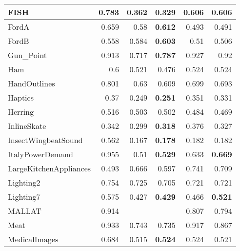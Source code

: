 \begin{longtable}[c]{|l||r||r|r||r|r|}
\hline
FISH &
0.783 &
0.362 &
0.329 &
0.606 &
0.606
\bigstrut\\
\hline
\rowcolor[rgb]{ .851,  .851,  .851} FordA &
0.659 &
0.58 &
\cellcolor[rgb]{ .973,  .796,  .678} \textbf{0.612} &
0.493 &
0.491
\bigstrut\\
\hline
FordB &
0.558 &
0.584 &
\cellcolor[rgb]{ .973,  .796,  .678} \textbf{0.603} &
0.51 &
0.506
\bigstrut\\
\hline
\rowcolor[rgb]{ .851,  .851,  .851} Gun\_Point &
0.913 &
0.717 &
\cellcolor[rgb]{ .973,  .796,  .678} \textbf{0.787} &
0.927 &
0.92
\bigstrut\\
\hline
Ham &
0.6 &
0.521 &
0.476 &
0.524 &
0.524
\bigstrut\\
\hline
\rowcolor[rgb]{ .851,  .851,  .851} HandOutlines &
0.801 &
0.63 &
0.609 &
0.699 &
0.693
\bigstrut\\
\hline
Haptics &
0.37 &
0.249 &
\cellcolor[rgb]{ .973,  .796,  .678} \textbf{0.251} &
0.351 &
0.331
\bigstrut\\
\hline
\rowcolor[rgb]{ .851,  .851,  .851} Herring &
0.516 &
0.503 &
0.502 &
0.484 &
0.469
\bigstrut\\
\hline
InlineSkate &
0.342 &
0.299 &
\cellcolor[rgb]{ .973,  .796,  .678} \textbf{0.318} &
0.376 &
0.327
\bigstrut\\
\hline
\rowcolor[rgb]{ .851,  .851,  .851} InsectWingbeatSound &
0.562 &
0.167 &
\cellcolor[rgb]{ .973,  .796,  .678} \textbf{0.178} &
0.182 &
0.182
\bigstrut\\
\hline
ItalyPowerDemand &
0.955 &
0.51 &
\cellcolor[rgb]{ .973,  .796,  .678} \textbf{0.529} &
0.633 &
\cellcolor[rgb]{ .973,  .796,  .678} \textbf{0.669}
\bigstrut\\
\hline
\rowcolor[rgb]{ .851,  .851,  .851} LargeKitchenAppliances &
0.493 &
0.666 &
0.597 &
0.741 &
0.709
\bigstrut\\
\hline
Lighting2 &
0.754 &
0.725 &
0.705 &
0.721 &
0.721
\bigstrut\\
\hline
\rowcolor[rgb]{ .851,  .851,  .851} Lighting7 &
0.575 &
0.427 &
\cellcolor[rgb]{ .973,  .796,  .678} \textbf{0.429} &
0.466 &
\cellcolor[rgb]{ .973,  .796,  .678} \textbf{0.521}
\bigstrut\\
\hline
MALLAT &
0.914 &
&
&
0.807 &
0.794
\bigstrut\\
\hline
\rowcolor[rgb]{ .851,  .851,  .851} Meat &
0.933 &
0.743 &
0.735 &
0.917 &
0.867
\bigstrut\\
\hline
MedicalImages &
0.684 &
0.515 &
\cellcolor[rgb]{ .973,  .796,  .678} \textbf{0.524} &
0.524 &
0.521
\bigstrut\\

\end{longtable}
